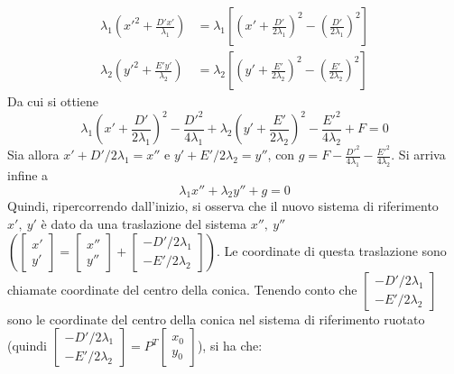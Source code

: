         \[
            \begin{aligned}
                \lambda_1 \left( x'^2 + \frac{D'x'}{\lambda_1} \right) &= \lambda_1 \left[\left(x' + \frac{D'}{2 \lambda_1}\right)^2 - \left( \frac{D'}{2 \lambda_1}\right)^2 \right]  \\
                \lambda_2 \left( y'^2 + \frac{E'y'}{\lambda_2} \right) &= \lambda_2 \left[\left(y' + \frac{E'}{2 \lambda_2}\right)^2 - \left( \frac{E'}{2 \lambda_2}\right)^2 \right]
            \end{aligned}
        \]
        Da cui si ottiene
        \[
            \lambda_1 \left(x' + \frac{D'}{2 \lambda_1}\right)^2 - \frac{D'^2}{4 \lambda_1} + \lambda_2 \left(y' + \frac{E'}{2 \lambda_2}\right)^2 - \frac{E'^2}{4 \lambda_2} + F = 0
        \]
        Sia allora $x' + D '/ 2 \lambda_1 = x''$ e $y' + E' / 2 \lambda_2 = y''$, con $g = F - \frac{D'^2}{4 \lambda_1} - \frac{E'^2}{4 \lambda_2}$. Si arriva infine a
        \[
            \lambda_1 x'' + \lambda_2 y'' + g = 0
        \]
        Quindi, ripercorrendo dall'inizio, si osserva che il nuovo sistema di riferimento $x', \: y'$ è dato da una traslazione del sistema $x'', \: y''$ $\left( \begin{bmatrix} x' \\ y' \end{bmatrix} = \begin{bmatrix} x'' \\ y'' \end{bmatrix} + \begin{bmatrix} - D' / 2 \lambda_1 \\ - E' / 2 \lambda_2 \end{bmatrix} \right)$. Le coordinate di questa traslazione sono chiamate coordinate del centro della conica.
        Tenendo conto che $\begin{bmatrix} - D' / 2 \lambda_1 \\ - E' / 2 \lambda_2 \end{bmatrix}$ sono le coordinate del centro della conica nel sistema di riferimento ruotato (quindi $\begin{bmatrix} - D' / 2 \lambda_1 \\ - E' / 2 \lambda_2 \end{bmatrix} = P^{T} \begin{bmatrix} x_0 \\ y_0 \end{bmatrix}$), si ha che:
